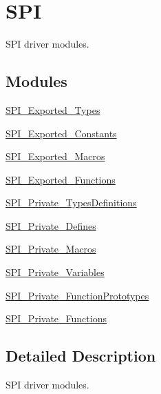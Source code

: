 \hypertarget{group___s_p_i}{}\section{S\+PI}
\label{group___s_p_i}


S\+PI driver modules.  


\subsection*{Modules}
\begin{DoxyCompactItemize}
\item 
\hyperlink{group___s_p_i___exported___types}{S\+P\+I\+\_\+\+Exported\+\_\+\+Types}
\item 
\hyperlink{group___s_p_i___exported___constants}{S\+P\+I\+\_\+\+Exported\+\_\+\+Constants}
\item 
\hyperlink{group___s_p_i___exported___macros}{S\+P\+I\+\_\+\+Exported\+\_\+\+Macros}
\item 
\hyperlink{group___s_p_i___exported___functions}{S\+P\+I\+\_\+\+Exported\+\_\+\+Functions}
\item 
\hyperlink{group___s_p_i___private___types_definitions}{S\+P\+I\+\_\+\+Private\+\_\+\+Types\+Definitions}
\item 
\hyperlink{group___s_p_i___private___defines}{S\+P\+I\+\_\+\+Private\+\_\+\+Defines}
\item 
\hyperlink{group___s_p_i___private___macros}{S\+P\+I\+\_\+\+Private\+\_\+\+Macros}
\item 
\hyperlink{group___s_p_i___private___variables}{S\+P\+I\+\_\+\+Private\+\_\+\+Variables}
\item 
\hyperlink{group___s_p_i___private___function_prototypes}{S\+P\+I\+\_\+\+Private\+\_\+\+Function\+Prototypes}
\item 
\hyperlink{group___s_p_i___private___functions}{S\+P\+I\+\_\+\+Private\+\_\+\+Functions}
\end{DoxyCompactItemize}


\subsection{Detailed Description}
S\+PI driver modules. 

